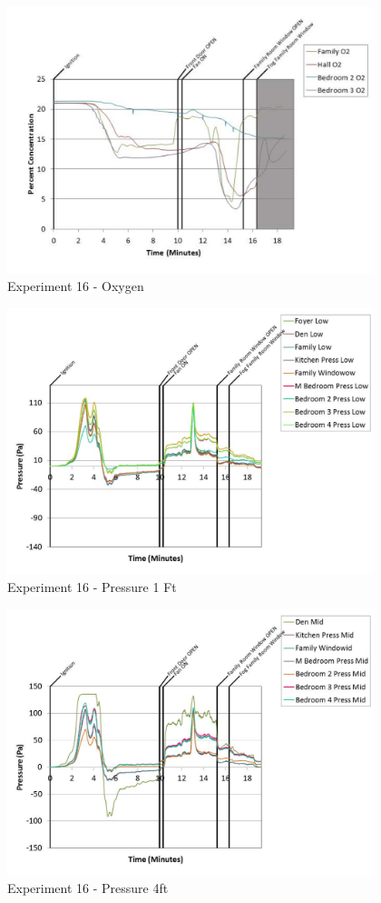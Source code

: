 \documentclass{article}
\begin{document}
\begin{appendices}
	\clearpage

	\begin{figure}[h!]
		\centering
		\includegraphics[height=3.05in]{0_Images/Results_Charts/Exp_16_Charts/Oxygen.pdf}
		\caption{Experiment 16 - Oxygen}
	\end{figure}
 

	\begin{figure}[h!]
		\centering
		\includegraphics[height=3.05in]{0_Images/Results_Charts/Exp_16_Charts/Pressure1Ft.pdf}
		\caption{Experiment 16 - Pressure 1 Ft}
	\end{figure}
 
	\clearpage

	\begin{figure}[h!]
		\centering
		\includegraphics[height=3.05in]{0_Images/Results_Charts/Exp_16_Charts/Pressure4ft.pdf}
		\caption{Experiment 16 - Pressure 4ft}
	\end{figure}
 


\end{appendices}
\end{document}
